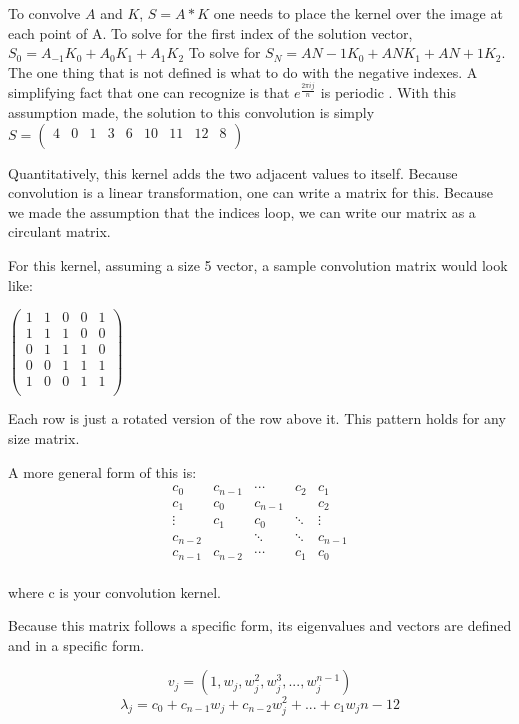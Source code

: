 \documentclass[11pt]{article}
\begin{document}
To convolve $A$ and $K$, $S = A*K$ one needs to place the kernel over the image at each point of A. To solve for the first index of the solution vector, $S_0 = A_{-1}K_{0}+A_{0}K_{1}+A_{1}K_{2}$ To solve for $S_N = A{N-1}K_{0}+A{N}K_{1}+A{N+1}K_{2}$. The one thing that is not defined is what to do with the negative indexes. A simplifying fact that one can recognize is that $e^{\frac{2\pi i j}{n}}$ is periodic . With this assumption made, the solution to this convolution is simply 
$ S = \begin{pmatrix}
	4 & 0 & 1 & 3 & 6 & 10 & 11 & 12 & 8\\
\end{pmatrix}$

Quantitatively, this kernel adds the two adjacent values to itself. Because convolution is a linear transformation, one can write a matrix for this. Because we made the assumption that the indices loop, we can write our matrix as a circulant matrix. 

For this kernel, assuming a size 5 vector, a sample convolution matrix would look like: 

$\begin{pmatrix}
	1 & 1 & 0 & 0 & 1\\
	1 & 1 & 1 & 0 & 0\\
	0 & 1 & 1 & 1 & 0\\
	0 & 0 & 1 & 1 & 1 \\
	1 & 0 & 0 & 1 & 1\\
\end{pmatrix}$

Each row is just a rotated version of the row above it. This pattern holds for any size matrix.

A more general form of this is:
$$\begin{matrix}
	c_0 & c_{n-1} & \cdots & c_2 & c_1\\
	c_1 & c_0 & c_{n-1} &  & c_2\\
	\vdots & c_1 & c_0 & \ddots & \vdots\\
	c_{n-2} &   & \ddots & \ddots & c_{n-1}\\
	c_{n-1} & c_{n-2} & \cdots & c_1 & c_0\\
\end{matrix}$$

where c is your convolution kernel. 

Because this matrix follows a specific form, its eigenvalues and vectors are defined and in a specific form.

$$v_j = (1, w_j, w_j^2, w_j^3, ..., w_j^{n-1})$$
$$\lambda_j =c_0+c_{n-1}w_j	+c_{n-2}w_j^2+...+c_{1}w_j{n-1}2$$
\end{document}
